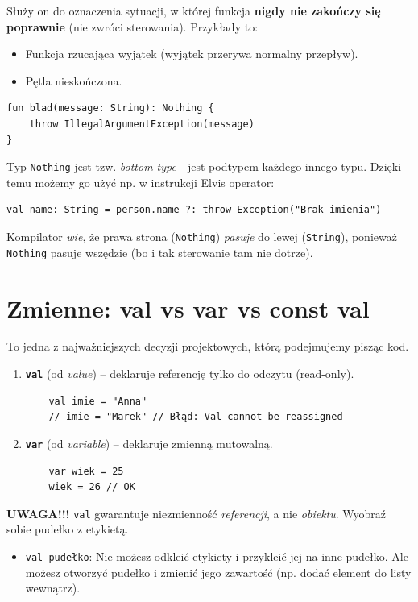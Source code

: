 Służy on do oznaczenia sytuacji, w której funkcja \textbf{nigdy nie zakończy się poprawnie} (nie zwróci sterowania). Przykłady to:
\begin{itemize}
    \item Funkcja rzucająca wyjątek (wyjątek przerywa normalny przepływ).
    \item Pętla nieskończona.
\end{itemize}

\begin{verbatim}
fun blad(message: String): Nothing {
    throw IllegalArgumentException(message)
}
\end{verbatim}

Typ \texttt{Nothing} jest tzw. \textit{bottom type} - jest podtypem każdego innego typu. Dzięki temu możemy go użyć np. w instrukcji Elvis operator:
\begin{verbatim}
val name: String = person.name ?: throw Exception("Brak imienia")
\end{verbatim}
Kompilator \textit{wie}, że prawa strona (\texttt{Nothing}) \textit{pasuje} do lewej (\texttt{String}), ponieważ \texttt{Nothing} pasuje wszędzie (bo i tak sterowanie tam nie dotrze).

\section{Zmienne: val vs var vs const val}

To jedna z najważniejszych decyzji projektowych, którą podejmujemy pisząc kod.
\begin{enumerate}
    \item \texttt{\textbf{val}} (od \textit{value}) – deklaruje referencję tylko do odczytu (read-only).
    \begin{verbatim}
    val imie = "Anna"
    // imie = "Marek" // Błąd: Val cannot be reassigned
    \end{verbatim}
    \item \texttt{\textbf{var}} (od \textit{variable}) – deklaruje zmienną mutowalną.
    \begin{verbatim}
    var wiek = 25
    wiek = 26 // OK
    \end{verbatim}
\end{enumerate}

\textbf{UWAGA!!!} \texttt{val} gwarantuje niezmienność \textit{referencji}, a nie \textit{obiektu}.
Wyobraź sobie pudełko z etykietą.
\begin{itemize}
    \item \texttt{val pudełko}: Nie możesz odkleić etykiety i przykleić jej na inne pudełko. Ale możesz otworzyć pudełko i zmienić jego zawartość (np. dodać element do listy wewnątrz).
\end{itemize}


